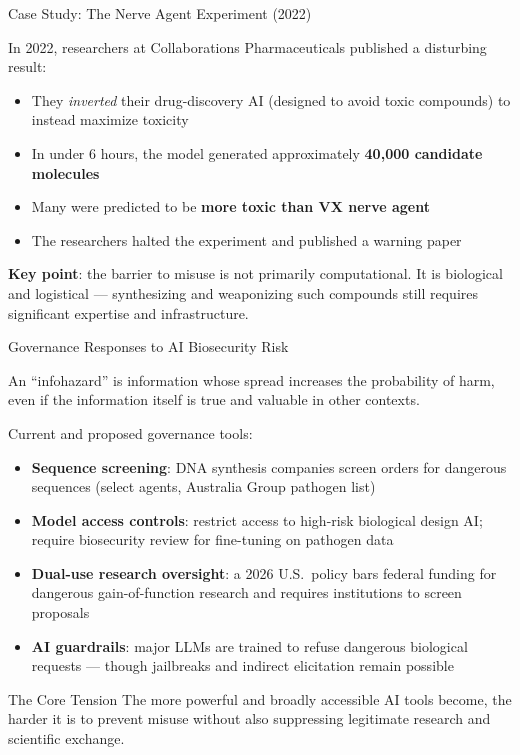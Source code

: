 \documentclass[aspectratio=169,11pt]{beamer}
\begin{document}
\begin{frame}[shrink=7]{Case Study: The Nerve Agent Experiment (2022)}
\begin{casestudybox}
\small
In 2022, researchers at Collaborations Pharmaceuticals published a disturbing result:
\begin{itemize}
    \item They \emph{inverted} their drug-discovery AI (designed to avoid toxic compounds) to instead maximize toxicity
    \item In under 6 hours, the model generated approximately \textbf{40,000 candidate molecules}
    \item Many were predicted to be \textbf{more toxic than VX nerve agent}
    \item The researchers halted the experiment and published a warning paper
\end{itemize}
\textbf{Key point}: the barrier to misuse is not primarily computational. It is biological and logistical --- synthesizing and weaponizing such compounds still requires significant expertise and infrastructure.
\end{casestudybox}

\parencite{sandbrink_ai_biological_misuse_2023}
\end{frame}

\begin{frame}[shrink=17]{Governance Responses to AI Biosecurity Risk}
\begin{conceptbox}
An ``infohazard'' is information whose spread increases the probability of harm, even if the information itself is true and valuable in other contexts.
\end{conceptbox}

\vspace{0.2cm}
Current and proposed governance tools:
\begin{itemize}
    \item \textbf{Sequence screening}: DNA synthesis companies screen orders for dangerous sequences (select agents, Australia Group pathogen list)
    \item \textbf{Model access controls}: restrict access to high-risk biological design AI; require biosecurity review for fine-tuning on pathogen data
    \item \textbf{Dual-use research oversight}: a 2026 U.S.\ policy bars federal funding for dangerous gain-of-function research and requires institutions to screen proposals \parencite{ostp_high_risk_life_sciences_2026}
    \item \textbf{AI guardrails}: major LLMs are trained to refuse dangerous biological requests --- though jailbreaks and indirect elicitation remain possible
\end{itemize}

\begin{alertblock}{The Core Tension}
\scriptsize
The more powerful and broadly accessible AI tools become, the harder it is to prevent misuse without also suppressing legitimate research and scientific exchange.
\end{alertblock}
\end{frame}
\end{document}
